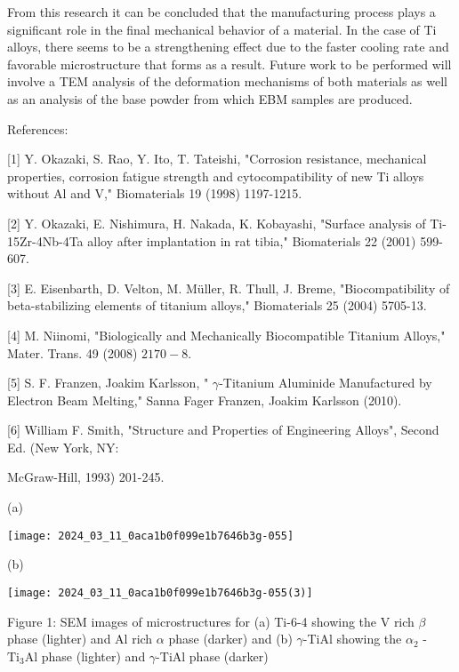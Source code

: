 \documentclass[10pt]{article}
\begin{document}
From this research it can be concluded that the manufacturing process plays a significant role in the final mechanical behavior of a material. In the case of Ti alloys, there seems to be a strengthening effect due to the faster cooling rate and favorable microstructure that forms as a result. Future work to be performed will involve a TEM analysis of the deformation mechanisms of both materials as well as an analysis of the base powder from which EBM samples are produced.

References:

[1] Y. Okazaki, S. Rao, Y. Ito, T. Tateishi, "Corrosion resistance, mechanical properties, corrosion fatigue strength and cytocompatibility of new Ti alloys without Al and V," Biomaterials 19 (1998) 1197-1215.

[2] Y. Okazaki, E. Nishimura, H. Nakada, K. Kobayashi, "Surface analysis of Ti-15Zr-4Nb-4Ta alloy after implantation in rat tibia," Biomaterials 22 (2001) 599-607.

[3] E. Eisenbarth, D. Velton, M. Müller, R. Thull, J. Breme, "Biocompatibility of beta-stabilizing elements of titanium alloys," Biomaterials 25 (2004) 5705-13.

[4] M. Niinomi, "Biologically and Mechanically Biocompatible Titanium Alloys," Mater. Trans. 49 (2008) $2170-8$.

[5] S. F. Franzen, Joakim Karlsson, " $\gamma$-Titanium Aluminide Manufactured by Electron Beam Melting," Sanna Fager Franzen, Joakim Karlsson (2010).

[6] William F. Smith, "Structure and Properties of Engineering Alloys", Second Ed. (New York, NY:

McGraw-Hill, 1993) 201-245.

(a)

\begin{center}
\texttt{[image: 2024\_03\_11\_0aca1b0f099e1b7646b3g-055]}
\end{center}

(b)

\begin{center}
\texttt{[image: 2024\_03\_11\_0aca1b0f099e1b7646b3g-055(3)]}
\end{center}

Figure 1: SEM images of microstructures for (a) Ti-6-4 showing the $\mathrm{V}$ rich $\beta$ phase (lighter) and $\mathrm{Al}$ rich $\alpha$ phase (darker) and (b) $\gamma$-TiAl showing the $\alpha_{2}$ - $\mathrm{Ti}_{3} \mathrm{Al}$ phase (lighter) and $\gamma$-TiAl phase (darker)
\end{document}
